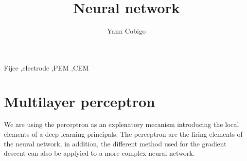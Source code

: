\documentclass[final, paper=letter,5p,times,twocolumn]{elsarticle}
\begin{document}
\begin{frontmatter}

\title{Neural network}

\author[label1]{Yann Cobigo}
\address[label1]{University of California, San Francisco | ucsf.edu}




\begin{abstract}
 \lipsum[11-15]
\end{abstract}

\begin{keyword}
Fijee \sep electrode \sep PEM \sep CEM
\end{keyword}

\end{frontmatter}


\lipsum[100-104]

\section{Multilayer perceptron}

We are using the perceptron as an explenatory mecanism introducing the local elements of a deep learning principals. The perceptron are the firing elements of the neural network, in addition, the different method used for the gradient descent can also be applyied to a more complex neural network.
\end{document}
